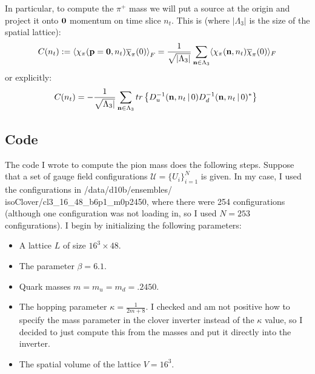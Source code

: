 \documentclass[11pt, oneside]{article}   	%
\theoremstyle{definition}
\begin{document}
In particular, to compute the $\pi^+$ mass we will put a source at the origin and project it onto $\textbf 0$ momentum 
on time slice $n_t$. This is (where $|\Lambda_3|$ is the size of the spatial lattice):
\begin{equation}
	C(n_t) := \left\langle \chi_\pi(\textbf p = \textbf 0, n_t)\overline\chi_\pi (0)\right\rangle_F = \frac{1}{\sqrt{
	|\Lambda_3|}}\sum_{\mathbf n\in\Lambda_3}\langle \chi_\pi(\textbf n, n_t)\overline\chi_\pi(0)\rangle_F
\end{equation}
or explicitly:
\begin{equation}
	C(n_t) = -\frac{1}{\sqrt{\Lambda_3|}}\sum_{\textbf n\in\Lambda_3} tr\left\{ D^{-1}_u (\textbf n, n_t \,|\, 0) D^{-1}_d 
	(\textbf n, n_t \,|\,0)^*\right\}~
	\label{eq:zero_projection}
\end{equation}

\newpage
\subsection{Code}

The code I wrote to compute the pion mass does the following steps. Suppose that a set of gauge field 
configurations $\mathcal U = \{U_i\}_{i = 1}^N$ is given. In my case, I used the configurations in 
/data/d10b/ensembles/ isoClover/cl3\_16\_48\_b6p1\_m0p2450, where there were 254 configurations (although one 
configuration was not loading in, so I used $N = 253$ configurations). I begin by initializing the following parameters:
\begin{itemize}
	\item A lattice $L$ of size $16^3\times 48$. 
	\item The parameter $\beta = 6.1$.
	\item Quark masses $m = m_u = m_d = .2450$.
	\item The hopping parameter $\kappa = \frac{1}{2m + 8}$. I checked and am not positive how to specify the 
	mass parameter in the clover inverter instead of the $\kappa$ value, so I decided to just compute this from the 
	masses and put it directly into the inverter. 
	\item The spatial volume of the lattice $V = 16^3$.
\end{itemize}
\end{document}
